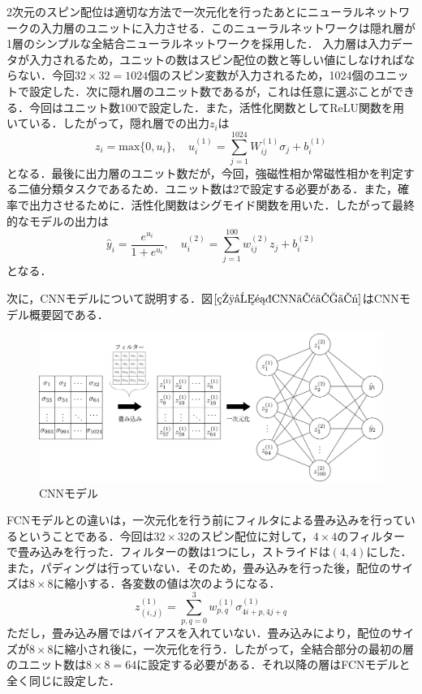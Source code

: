 \documentclass[a4paper,11pt]{jsreport}
\begin{document}
2次元のスピン配位は適切な方法で一次元化を行ったあとにニューラルネットワークの入力層のユニットに入力させる．このニューラルネットワークは隠れ層が1層のシンプルな全結合ニューラルネットワークを採用した．
入力層は入力データが入力されるため，ユニットの数はスピン配位の数と等しい値にしなければならない．今回$32 \times 32 = 1024$個のスピン変数が入力されるため，1024個のユニットで設定した．次に隠れ層のユニット数であるが，これは任意に選ぶことができる．今回はユニット数100で設定した．また，活性化関数としてReLU関数を用いている．したがって，隠れ層での出力$z_i$は
\begin{equation}
  z_i 
  = \mathrm{max}\{0,u_i\}, \quad
  u_i^{(1)} = \sum_{j=1}^{1024} W_{ij}^{(1)} \sigma_j + b_i^{(1)}
\end{equation}
となる．最後に出力層のユニット数だが，今回，強磁性相か常磁性相かを判定する二値分類タスクであるため．ユニット数は2で設定する必要がある．また，確率で出力させるために．活性化関数はシグモイド関数を用いた．したがって最終的なモデルの出力は
\begin{equation}
  \hat{y}_i 
  = \frac{e^{u_i}}{1 + e^{u_i}}, \quad
  u_i^{(2)} = \sum_{j=1}^{100} w_{ij}^{(2)} z_j + b_i^{(2)}
\end{equation}
となる．







次に，CNNモデルについて説明する．図$\ref{相分類CNNモデル}$はCNNモデル概要図である．

\begin{figure}[H]
   \begin{center}
       \includegraphics[width=\linewidth]{image/相分類CNNモデル.png}
       \caption{CNNモデル}
       \label{相分類CNNモデル}
   \end{center}
\end{figure}

FCNモデルとの違いは，一次元化を行う前にフィルタによる畳み込みを行っているということである．今回は$32 \times 32$のスピン配位に対して，$4 \times 4$のフィルターで畳み込みを行った．フィルターの数は1つにし，ストライドは$(4,4)$にした．また，パディングは行っていない．そのため，畳み込みを行った後，配位のサイズは$8 \times 8$に縮小する．各変数の値は次のようになる．
\begin{equation}
  z_{(i,j)}^{(1)}
  = \sum_{p,q=0}^{3} w_{p,q}^{(1)} \sigma_{4i+p,4j+q}^{(1)}
\end{equation}
ただし，畳み込み層ではバイアスを入れていない．畳み込みにより，配位のサイズが$8 \times 8$に縮小され後に，一次元化を行う．したがって，全結合部分の最初の層のユニット数は$8 \times 8 = 64$に設定する必要がある．それ以降の層はFCNモデルと全く同じに設定した．
\end{document}
